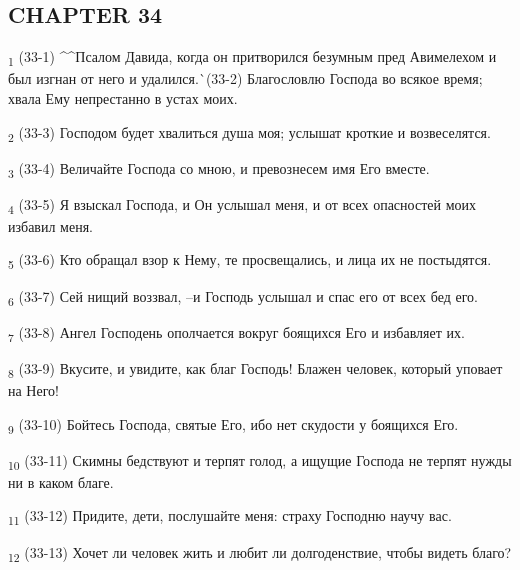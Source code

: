 \subsection{CHAPTER 34}
\begin{tcolorbox}
\textsubscript{1} (33-1) ^^Псалом Давида, когда он притворился безумным пред Авимелехом и был изгнан от него и удалился.^^ (33-2) Благословлю Господа во всякое время; хвала Ему непрестанно в устах моих.
\end{tcolorbox}
\begin{tcolorbox}
\textsubscript{2} (33-3) Господом будет хвалиться душа моя; услышат кроткие и возвеселятся.
\end{tcolorbox}
\begin{tcolorbox}
\textsubscript{3} (33-4) Величайте Господа со мною, и превознесем имя Его вместе.
\end{tcolorbox}
\begin{tcolorbox}
\textsubscript{4} (33-5) Я взыскал Господа, и Он услышал меня, и от всех опасностей моих избавил меня.
\end{tcolorbox}
\begin{tcolorbox}
\textsubscript{5} (33-6) Кто обращал взор к Нему, те просвещались, и лица их не постыдятся.
\end{tcolorbox}
\begin{tcolorbox}
\textsubscript{6} (33-7) Сей нищий воззвал, --и Господь услышал и спас его от всех бед его.
\end{tcolorbox}
\begin{tcolorbox}
\textsubscript{7} (33-8) Ангел Господень ополчается вокруг боящихся Его и избавляет их.
\end{tcolorbox}
\begin{tcolorbox}
\textsubscript{8} (33-9) Вкусите, и увидите, как благ Господь! Блажен человек, который уповает на Него!
\end{tcolorbox}
\begin{tcolorbox}
\textsubscript{9} (33-10) Бойтесь Господа, святые Его, ибо нет скудости у боящихся Его.
\end{tcolorbox}
\begin{tcolorbox}
\textsubscript{10} (33-11) Скимны бедствуют и терпят голод, а ищущие Господа не терпят нужды ни в каком благе.
\end{tcolorbox}
\begin{tcolorbox}
\textsubscript{11} (33-12) Придите, дети, послушайте меня: страху Господню научу вас.
\end{tcolorbox}
\begin{tcolorbox}
\textsubscript{12} (33-13) Хочет ли человек жить и любит ли долгоденствие, чтобы видеть благо?
\end{tcolorbox}
